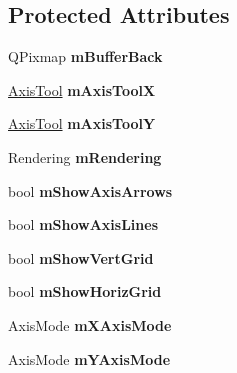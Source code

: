 \subsection*{Protected Attributes}
\begin{DoxyCompactItemize}
\item 
\hypertarget{class_graph_view_a61b864cbb4ed70d43b6b963dbb62af8d}{Q\-Pixmap {\bfseries m\-Buffer\-Back}}\label{class_graph_view_a61b864cbb4ed70d43b6b963dbb62af8d}

\item 
\hypertarget{class_graph_view_a22d4710a6e4a69cb248be7f7e5e05deb}{\hyperlink{class_axis_tool}{Axis\-Tool} {\bfseries m\-Axis\-Tool\-X}}\label{class_graph_view_a22d4710a6e4a69cb248be7f7e5e05deb}

\item 
\hypertarget{class_graph_view_a67d7505159996ac01a41bb850be9a658}{\hyperlink{class_axis_tool}{Axis\-Tool} {\bfseries m\-Axis\-Tool\-Y}}\label{class_graph_view_a67d7505159996ac01a41bb850be9a658}

\item 
\hypertarget{class_graph_view_a6e2e5d7a501621f3e48d89efbc418af5}{Rendering {\bfseries m\-Rendering}}\label{class_graph_view_a6e2e5d7a501621f3e48d89efbc418af5}

\item 
\hypertarget{class_graph_view_a457e7e32c3b4acb89b2c38c6247b1618}{bool {\bfseries m\-Show\-Axis\-Arrows}}\label{class_graph_view_a457e7e32c3b4acb89b2c38c6247b1618}

\item 
\hypertarget{class_graph_view_ab515b2249754439c8dbacf8350034ebd}{bool {\bfseries m\-Show\-Axis\-Lines}}\label{class_graph_view_ab515b2249754439c8dbacf8350034ebd}

\item 
\hypertarget{class_graph_view_ad0788cfb93b4e8697b19c0978956e689}{bool {\bfseries m\-Show\-Vert\-Grid}}\label{class_graph_view_ad0788cfb93b4e8697b19c0978956e689}

\item 
\hypertarget{class_graph_view_a88c1765544454498f2b2706968790dd1}{bool {\bfseries m\-Show\-Horiz\-Grid}}\label{class_graph_view_a88c1765544454498f2b2706968790dd1}

\item 
\hypertarget{class_graph_view_a4faf8443011572dcd36b1745d36398bf}{Axis\-Mode {\bfseries m\-X\-Axis\-Mode}}\label{class_graph_view_a4faf8443011572dcd36b1745d36398bf}

\item 
\hypertarget{class_graph_view_a09917412cfe4b5070f916d8427fc67fe}{Axis\-Mode {\bfseries m\-Y\-Axis\-Mode}}\label{class_graph_view_a09917412cfe4b5070f916d8427fc67fe}


\end{DoxyCompactItemize}
